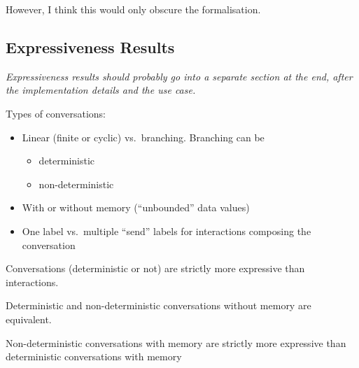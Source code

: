 However, I think this would only obscure the formalisation.


\subsection{Expressiveness Results}
\label{sec:expressiveness}

{\em Expressiveness results should probably go into a separate section at
  the end, after the implementation details and the use case.}

Types of conversations:
\begin{itemize}
\item Linear (finite or cyclic) vs.\ branching.  Branching can be
  \begin{itemize}
  \item deterministic
  \item non-deterministic
  \end{itemize}
\item With or without memory (``unbounded'' data values)
\item One label vs.\ multiple ``send'' labels for interactions composing
  the conversation
\end{itemize}

Conversations (deterministic or not) are strictly more expressive than
interactions.

Deterministic and non-deterministic conversations without memory are
equivalent.

Non-deterministic conversations with memory are strictly more expressive
than deterministic conversations with memory

